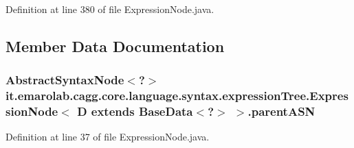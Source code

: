 Definition at line 380 of file Expression\-Node.\-java.



\subsection{Member Data Documentation}
\hypertarget{classit_1_1emarolab_1_1cagg_1_1core_1_1language_1_1syntax_1_1expressionTree_1_1ExpressionNode_3_3eaf7c0f6a4bc47f4823e05ca883c5af_a0baf86a077f4187b860688c1c89b8209}{
\subsubsection[{parent\-A\-S\-N}]{\setlength{\rightskip}{0pt plus 5cm}Abstract\-Syntax\-Node$<$?$>$ it.\-emarolab.\-cagg.\-core.\-language.\-syntax.\-expression\-Tree.\-Expression\-Node$<$ D extends Base\-Data$<$?$>$ $>$.parent\-A\-S\-N\hspace{0.3cm}{\ttfamily [private]}}}\label{classit_1_1emarolab_1_1cagg_1_1core_1_1language_1_1syntax_1_1expressionTree_1_1ExpressionNode_3_3eaf7c0f6a4bc47f4823e05ca883c5af_a0baf86a077f4187b860688c1c89b8209}


Definition at line 37 of file Expression\-Node.\-java.

